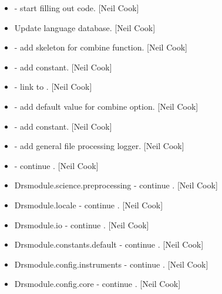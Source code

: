 \documentclass[a4paper,10pt,english]{report}
\begin{document}
\begin{itemize}
\item {} 
 - start filling out code. {[}Neil Cook{]}

\item {} 
Update language database. {[}Neil Cook{]}

\item {} 
 - add skeleton for combine function. {[}Neil Cook{]}

\item {} 
 - add 
constant. {[}Neil Cook{]}

\item {} 
 - link to . {[}Neil
Cook{]}

\item {} 
 - add default value for
combine option. {[}Neil Cook{]}

\item {} 
 - add  constant.
{[}Neil Cook{]}

\item {} 
 - add general file processing logger. {[}Neil Cook{]}

\item {} 
 - continue . {[}Neil
Cook{]}

\item {} 
Drsmodule.science.preprocessing - continue . {[}Neil Cook{]}

\item {} 
Drsmodule.locale - continue . {[}Neil Cook{]}

\item {} 
Drsmodule.io - continue . {[}Neil Cook{]}

\item {} 
Drsmodule.constants.default - continue . {[}Neil Cook{]}

\item {} 
Drsmodule.config.instruments - continue . {[}Neil Cook{]}

\item {} 
Drsmodule.config.core - continue . {[}Neil Cook{]}


\end{itemize}
\end{document}
